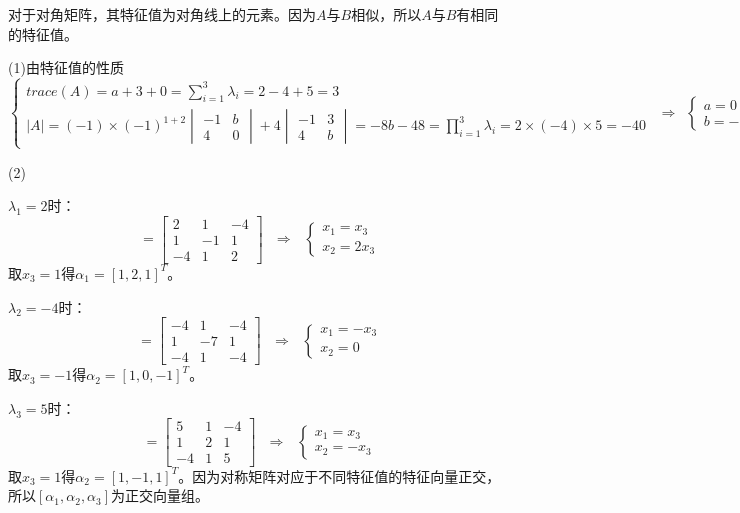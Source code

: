 \documentclass{article}
\begin{document}
\begin{jie}
对于对角矩阵，其特征值为对角线上的元素。因为$A$与$B$相似，所以$A$与$B$有相同的特征值。

(1)由特征值的性质
\begin{equation*}
\begin{cases}
trace(A)=a+3+0=\sum\limits_{i=1}^{3}\lambda_i=2-4+5=3\\
|A|=(-1)\times(-1)^{1+2}
\begin{vmatrix}
  -1 & b\\
  4 & 0
\end{vmatrix}+4
\begin{vmatrix}
  -1 & 3\\
  4  & b
\end{vmatrix}=-8b-48=\prod\limits_{i=1}^{3}\lambda_i=2\times(-4)\times5=-40
\end{cases}~~\Rightarrow~~\begin{cases}a=0\\ b=-1\end{cases}
\end{equation*}

(2)

$\lambda_1=2$时：
\begin{equation*}
[\lambda E-A]=
\begin{bmatrix}
  2 & 1 & -4\\
  1 & -1 &1\\
  -4 & 1 & 2
\end{bmatrix}~~~\Rightarrow~~~
\begin{cases}
 x_1=x_3\\
 x_2=2x_3
\end{cases}
\end{equation*}
取$x_3=1$得$\alpha_1=[1,2,1]^T$。

$\lambda_2=-4$时：
\begin{equation*}
[\lambda E-A]=
\begin{bmatrix}
  -4 & 1 & -4\\
  1 & -7 &1\\
  -4 & 1 & -4
\end{bmatrix}~~~\Rightarrow~~~
\begin{cases}
 x_1=-x_3\\
 x_2=0
\end{cases}
\end{equation*}
取$x_3=-1$得$\alpha_2=[1,0,-1]^T$。

$\lambda_3=5$时：
\begin{equation*}
[\lambda E-A]=
\begin{bmatrix}
  5 & 1 & -4\\
  1 & 2 &1\\
  -4 & 1 & 5
\end{bmatrix}~~~\Rightarrow~~~
\begin{cases}
 x_1=x_3\\
 x_2=-x_3
\end{cases}
\end{equation*}
取$x_3=1$得$\alpha_2=[1,-1,1]^T$。因为对称矩阵对应于不同特征值的特征向量正交，所以$[\alpha_1,\alpha_2,\alpha_3]$为正交向量组。


\end{jie}
\end{document}
